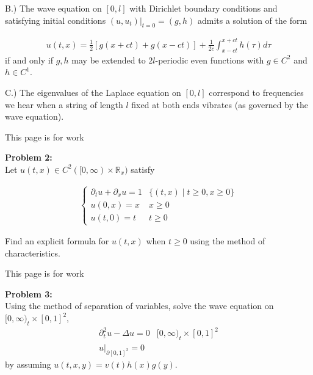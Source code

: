\documentclass{article}
\newcommand{\R}{{\mathbb{R}}}
\newcommand{\pd}{\partial}
\begin{document}
\vspace{3 cm}
B.) The wave equation on $[0,l]$ with Dirichlet boundary conditions and satisfying initial conditions $(u,u_{t})|_{t=0} = (g,h)$ admits a solution of the form 

\begin{align*}
	u(t,x) = \frac{1}{2} \left[g(x+ct) + g(x-ct) \right] + \frac{1}{2c} \int_{x-ct}^{x+ct} h(\tau) d\tau
\end{align*}
if and only if $g,h$ may be extended to $2l$-periodic even functions with $g \in C^{2}$ and $h \in C^{1}$. 

\vspace{3 cm}
C.) The eigenvalues of the Laplace equation on $[0,l]$ correspond to frequencies we hear when a string of length $l$ fixed at both ends vibrates (as governed by the wave equation). 


\newpage

This page is for work
\newpage



\textbf{Problem 2:} \\

Let $u(t,x) \in C^{2}([0,\infty) \times \R_{x})$ satisfy

\begin{align*}
	\begin{cases}
		\pd_{t}u + \pd_{x}u = 1 & \{(t,x) \mid t \geq 0, x \geq 0\} \\
		u(0,x) = x & x \geq 0 \\
		u(t,0) = t & t \geq 0
	\end{cases}
\end{align*}

Find an explicit formula for $u(t,x)$ when $t \geq 0$ using the method of characteristics. 


\newpage

\vspace{0.5 cm}

\newpage

This page is for work
\newpage



\textbf{Problem 3:} \\

Using the method of separation of variables, solve the wave equation on $[0,\infty)_{t} \times [0,1]^{2}$, 
\begin{align*}
	\pd_{t}^{2} u - \Delta u = 0 & [0,\infty)_{t} \times [0,1]^{2} \\
	u|_{\pd [0,1]^{2}} = 0
\end{align*}
by assuming $u(t,x,y) = v(t)h(x)g(y)$. 
\end{document}
